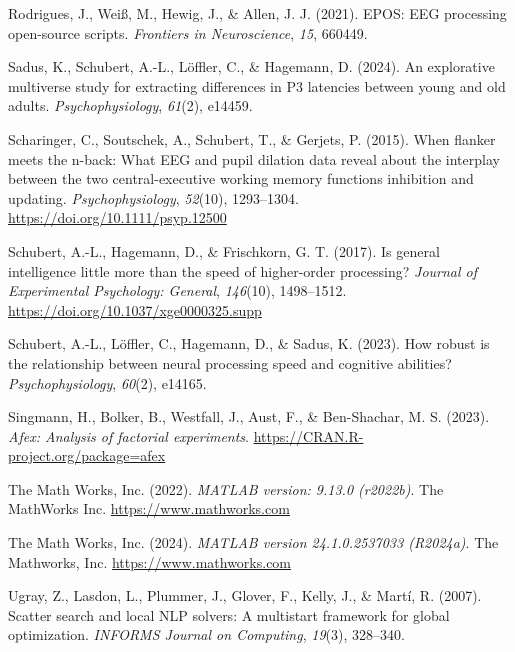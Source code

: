 \documentclass[
  man]{apa7}
\newlength{\cslhangindent}
\newlength{\cslentryspacingunit} %
\newenvironment{CSLReferences}[2] %
 {%
  \setlength{\parindent}{0pt}
  \ifodd #1
  \let\oldpar\par
  \def\par{\hangindent=\cslhangindent\oldpar}
  \fi
  \setlength{\parskip}{#2\cslentryspacingunit}
 }%
 {}
\begin{document}
\begin{CSLReferences}{1}{0}
\leavevmode{}%
Rodrigues, J., Weiß, M., Hewig, J., \& Allen, J. J. (2021). {EPOS}: {EEG} processing open-source scripts. \emph{Frontiers in Neuroscience}, \emph{15}, 660449.

\leavevmode{}%
Sadus, K., Schubert, A.-L., Löffler, C., \& Hagemann, D. (2024). An explorative multiverse study for extracting differences in {P3} latencies between young and old adults. \emph{Psychophysiology}, \emph{61}(2), e14459.

\leavevmode{}%
Scharinger, C., Soutschek, A., Schubert, T., \& Gerjets, P. (2015). When flanker meets the n-back: {What} {EEG} and pupil dilation data reveal about the interplay between the two central-executive working memory functions inhibition and updating. \emph{Psychophysiology}, \emph{52}(10), 1293--1304. \url{https://doi.org/10.1111/psyp.12500}

\leavevmode{}%
Schubert, A.-L., Hagemann, D., \& Frischkorn, G. T. (2017). Is general intelligence little more than the speed of higher-order processing? \emph{Journal of Experimental Psychology: General}, \emph{146}(10), 1498--1512. \url{https://doi.org/10.1037/xge0000325.supp}

\leavevmode{}%
Schubert, A.-L., Löffler, C., Hagemann, D., \& Sadus, K. (2023). How robust is the relationship between neural processing speed and cognitive abilities? \emph{Psychophysiology}, \emph{60}(2), e14165.

\leavevmode{}%
Singmann, H., Bolker, B., Westfall, J., Aust, F., \& Ben-Shachar, M. S. (2023). \emph{Afex: Analysis of factorial experiments}. \url{https://CRAN.R-project.org/package=afex}

\leavevmode{}%
The Math Works, Inc. (2022). \emph{{MATLAB} version: 9.13.0 (r2022b)}. The MathWorks Inc. \url{https://www.mathworks.com}

\leavevmode{}%
The Math Works, Inc. (2024). \emph{{MATLAB} version 24.1.0.2537033 ({R2024a})}. The Mathworks, Inc. \url{https://www.mathworks.com}

\leavevmode{}%
Ugray, Z., Lasdon, L., Plummer, J., Glover, F., Kelly, J., \& Martí, R. (2007). Scatter search and local {NLP} solvers: {A} multistart framework for global optimization. \emph{INFORMS Journal on Computing}, \emph{19}(3), 328--340.


\end{CSLReferences}
\end{document}
